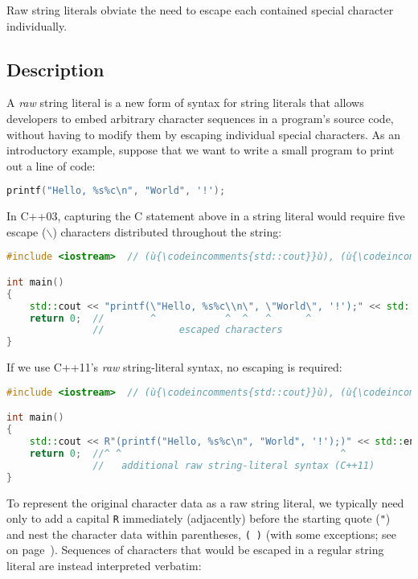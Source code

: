 

Raw string literals obviate the need to escape each contained special
character individually.

\subsection[Description]{Description}\label{description}

A \emph{raw} string literal is a new form of syntax for string literals
that allows developers to embed arbitrary character sequences in a
program's source code, without having to modify them by escaping
individual special characters. As an introductory example, suppose that
we want to write a small program to print out a line of code:

\begin{lstlisting}[language=C++]
printf("Hello, %s%c\n", "World", '!');
\end{lstlisting}
    
\noindent In C++03, capturing the C statement above in a string literal would
require five escape (\texttt{$\backslash$}) characters distributed
throughout the string:

\begin{lstlisting}[language=C++]
#include <iostream>  // (ù{\codeincomments{std::cout}}ù), (ù{\codeincomments{std::endl}}ù)

int main()
{
    std::cout << "printf(\"Hello, %s%c\\n\", \"World\", '!');" << std::endl;
    return 0;  //        ^            ^  ^   ^      ^
               //             escaped characters
}
\end{lstlisting}
    
\noindent If we use C++11's \emph{raw} string-literal syntax, no escaping is
required:

\begin{lstlisting}[language=C++]
#include <iostream>  // (ù{\codeincomments{std::cout}}ù), (ù{\codeincomments{std::endl}}ù)

int main()
{
    std::cout << R"(printf("Hello, %s%c\n", "World", '!');)" << std::endl;
    return 0;  //^ ^                                      ^
               //   additional raw string-literal syntax (C++11)
}
\end{lstlisting}
    
\noindent To represent the original character
data as a raw string literal, we typically need only to add a capital \texttt{R} immediately
(adjacently) before the starting quote (\texttt{"}) and nest the
character data within parentheses, \texttt{(}~\texttt{)} (with some exceptions; see \textit{} on page~\pageref{collisions}). Sequences of
characters that would be escaped in a regular string literal are instead
interpreted verbatim:

